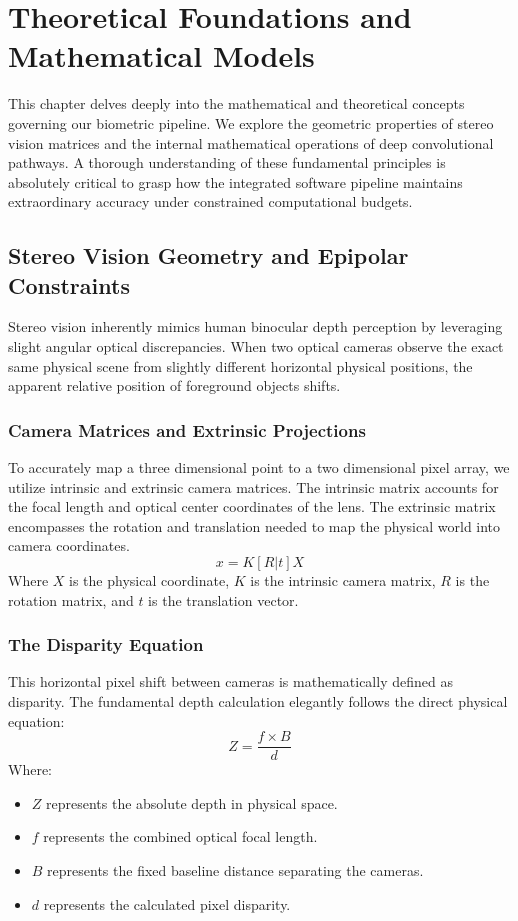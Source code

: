 \documentclass[12pt,a4paper]{report}
\begin{document}
\chapter{Theoretical Foundations and Mathematical Models}
This chapter delves deeply into the mathematical and theoretical concepts governing our biometric pipeline. We explore the geometric properties of stereo vision matrices and the internal mathematical operations of deep convolutional pathways. A thorough understanding of these fundamental principles is absolutely critical to grasp how the integrated software pipeline maintains extraordinary accuracy under constrained computational budgets.

\section{Stereo Vision Geometry and Epipolar Constraints}
Stereo vision inherently mimics human binocular depth perception by leveraging slight angular optical discrepancies. When two optical cameras observe the exact same physical scene from slightly different horizontal physical positions, the apparent relative position of foreground objects shifts.

\subsection{Camera Matrices and Extrinsic Projections}
To accurately map a three dimensional point to a two dimensional pixel array, we utilize intrinsic and extrinsic camera matrices. The intrinsic matrix accounts for the focal length and optical center coordinates of the lens. The extrinsic matrix encompasses the rotation and translation needed to map the physical world into camera coordinates.
\begin{equation}
x = K [R | t] X
\end{equation}
Where $X$ is the physical coordinate, $K$ is the intrinsic camera matrix, $R$ is the rotation matrix, and $t$ is the translation vector.

\subsection{The Disparity Equation}
This horizontal pixel shift between cameras is mathematically defined as disparity. The fundamental depth calculation elegantly follows the direct physical equation:
\begin{equation}
Z = \frac{f \times B}{d}
\end{equation}
Where:
\begin{itemize}
    \item $Z$ represents the absolute depth in physical space.
    \item $f$ represents the combined optical focal length.
    \item $B$ represents the fixed baseline distance separating the cameras.
    \item $d$ represents the calculated pixel disparity.
\end{itemize}
\end{document}
